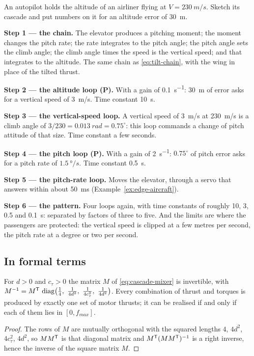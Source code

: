 \begin{example}
\label{ex:cascade-aircraft}
An autopilot holds the altitude of an airliner flying at $V = \SI{230}{m/s}$. Sketch its cascade and put numbers on it for an altitude error of \SI{30}{m}.

\textbf{Step 1 — the chain.} The elevator produces a pitching moment; the moment changes the pitch rate; the rate integrates to the pitch angle; the pitch angle sets the climb angle; the climb angle times the speed is the vertical speed; and that integrates to the altitude. The same chain as \cref{eq:tilt-chain}, with the wing in place of the tilted thrust.

\textbf{Step 2 — the altitude loop (P).} With a gain of \SI{0.1}{s^{-1}}: \SI{30}{m} of error asks for a vertical speed of \SI{3}{m/s}. Time constant \SI{10}{s}.

\textbf{Step 3 — the vertical-speed loop.} A vertical speed of \SI{3}{m/s} at \SI{230}{m/s} is a climb angle of $3/230 = \SI{0.013}{rad} = 0.75^\circ$: this loop commands a change of pitch attitude of that size. Time constant a few seconds.

\textbf{Step 4 — the pitch loop (P).} With a gain of \SI{2}{s^{-1}}: $0.75^\circ$ of pitch error asks for a pitch rate of $\SI{1.5}{\degree/s}$. Time constant \SI{0.5}{s}.

\textbf{Step 5 — the pitch-rate loop.} Moves the elevator, through a servo that answers within about \SI{50}{ms} (Example~\ref{ex:edge-aircraft}).

\textbf{Step 6 — the pattern.} Four loops again, with time constants of roughly 10, 3, 0.5 and \SI{0.1}{s}: separated by factors of three to five. And the limits are where the passengers are protected: the vertical speed is clipped at a few metres per second, the pitch rate at a degree or two per second.
\end{example}

\subsection{In formal terms}

\begin{theorem}
\label{thm:cascade-mixer}
For $d > 0$ and $c_\tau > 0$ the matrix $M$ of \cref{eq:cascade-mixer} is invertible, with $M^{-1} = M^\T\,\diag\!\big(\tfrac14,\ \tfrac{1}{4d^2},\ \tfrac{1}{4c_\tau^2},\ \tfrac{1}{4d^2}\big)$. Every combination of thrust and torques is produced by exactly one set of motor thrusts; it can be realised if and only if each of them lies in $[0, f_{max}]$.
\end{theorem}
\begin{proof}
The rows of $M$ are mutually orthogonal with the squared lengths $4$, $4d^2$, $4c_\tau^2$, $4d^2$, so $MM^{\mathsf{T}}$ is that diagonal matrix and $M^{\mathsf{T}}(MM^{\mathsf{T}})^{-1}$ is a right inverse, hence the inverse of the square matrix $M$.
\end{proof}

